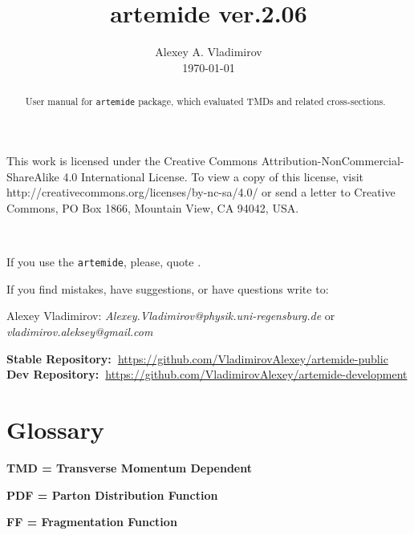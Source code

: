 \documentclass[prd,nofootinbib,eqsecnum,final]{revtex4}
\renewcommand{\(}{\left(}
\renewcommand{\)}{\right)}
\renewcommand{\[}{\left[}
\renewcommand{\]}{\right]}
\newcommand{\red}[1]{{\color[rgb]{1,0,0} #1}}
\newcommand{\blue}[1]{{\color{blue} #1}}
\begin{document}
\title{artemide ver.2.06}
\author{Alexey A. Vladimirov \\ \today}
\noaffiliation
\begin{abstract}
User manual for \texttt{artemide} package, which evaluated TMDs and related cross-sections.
\center{\red{\textbf{Manual is updating.}}}
\end{abstract}
\maketitle

\begin{tcolorbox}
\begin{center}
This work is licensed under the Creative Commons Attribution-NonCommercial-ShareAlike 4.0 International License. To view a copy of this license, visit http://creativecommons.org/licenses/by-nc-sa/4.0/ or send a letter to Creative Commons, PO Box 1866, Mountain View, CA 94042, USA.

~

If you use the \texttt{artemide}, please, quote \cite{Scimemi:2017etj}.

If you find mistakes, have suggestions, or have questions write to: 

Alexey Vladimirov: \textit{Alexey.Vladimirov@physik.uni-regensburg.de} or \textit{vladimirov.aleksey@gmail.com}
\end{center}
\end{tcolorbox}

\begin{center}
\textbf{\blue{Stable Repository:~}}\href{https://github.com/VladimirovAlexey/artemide-public}{https://github.com/VladimirovAlexey/artemide-public}
\\
\textbf{\blue{Dev Repository:~}}\href{https://github.com/VladimirovAlexey/artemide-development}{https://github.com/VladimirovAlexey/artemide-development}
\end{center}


\tableofcontents

\renewcommand{\arraystretch}{1.5}


\newpage
\section*{Glossary}

\textbf{TMD = Transverse Momentum Dependent}

\textbf{PDF = Parton Distribution Function}

\textbf{FF = Fragmentation Function}
\end{document}
